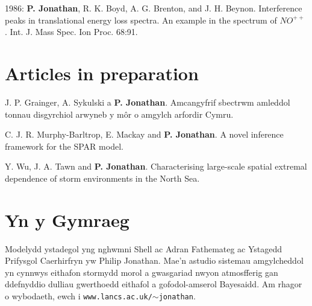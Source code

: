 \documentclass[11pt,a4paper]{moderncv}
\begin{document}
1986: \textbf{P. Jonathan}, R. K. Boyd, A. G. Brenton, and J. H. Beynon. Interference peaks in translational energy loss spectra. An example in the spectrum of $NO^{++}$ . Int. J. Mass Spec. Ion Proc. 68:91.

\setlength{\parskip}{0em}

\section{Articles in preparation}

\setlength{\parskip}{0.5em}

J. P. Grainger, A. Sykulski a \textbf{P. Jonathan}. Amcangyfrif sbectrwm amleddol tonnau disgyrchiol arwyneb y m\^or o amgylch arfordir Cymru.

C. J. R. Murphy-Barltrop, E. Mackay and \textbf{P. Jonathan}. A novel inference framework for the SPAR model.

Y. Wu, J. A. Tawn and \textbf{P. Jonathan}. Characterising large-scale spatial extremal dependence of storm environments in the North Sea.

\setlength{\parskip}{0em}

\section{Yn y Gymraeg}
Modelydd ystadegol yng nghwmni Shell ac Adran Fathemateg ac Ystagedd Prifysgol Caerhirfryn yw Philip Jonathan. Mae'n astudio sistemau amgylcheddol yn cynnwys eithafon stormydd morol a gwasgariad nwyon atmosfferig gan ddefnyddio dulliau gwerthoedd eithafol a gofodol-amserol Bayesaidd. Am rhagor o wybodaeth, ewch i \texttt{www.lancs.ac.uk/$\sim$jonathan}.

\clearpage
\end{document}
